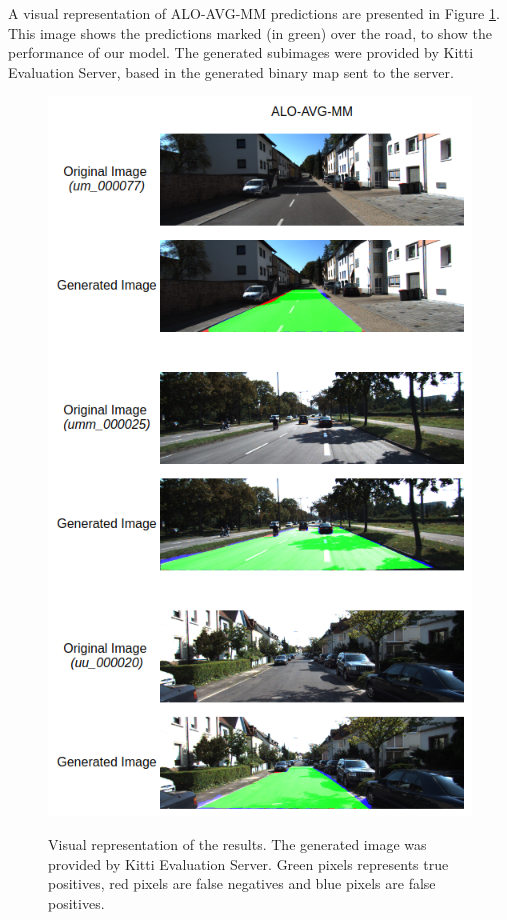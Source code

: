 

A visual representation of ALO-AVG-MM predictions are presented in Figure \ref{fig:visual_representation}. This image shows the predictions marked (in green) over the road, to show the performance of our model. The generated subimages were provided by Kitti Evaluation Server, based in the generated binary map sent to the server.

\begin{figure}
  \caption{Visual representation of the results. The generated image was provided by Kitti Evaluation Server. Green pixels represents true positives, red pixels are false negatives and blue pixels are false positives.}
  \centering
  \includegraphics[width=1.\columnwidth]{figures/falreis/visual_representation.png}
  \label{fig:visual_representation}
\end{figure}
